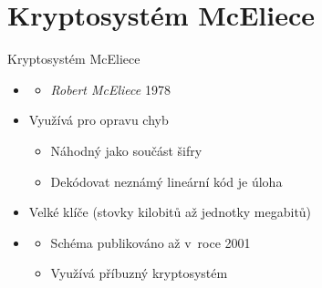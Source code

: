 \documentclass{beamer}
\begin{document}
\section{Kryptosystém McEliece}

\begin{frame}{Kryptosystém McEliece}
    \begin{itemize}

            \pause

        \item {}
            \begin{itemize}
                \item \emph{Robert McEliece} 1978~\cite{McEliece}
            \end{itemize}

            \pause
        \item Využívá  pro opravu chyb

            \begin{itemize}
                \item Náhodný  jako součást šifry
                \item Dekódovat neznámý lineární kód je 
                    úloha~\cite{Berlekamp1}
            \end{itemize}

            \pause
        \item \alert{Velké klíče} (stovky kilobitů až jednotky megabitů)

            \pause
        \item {}

            \pause
        \begin{itemize}

            \item Schéma publikováno až v~roce 2001~\cite{Courtois}
            \item Využívá příbuzný kryptosystém ~\cite{Niederreiter}

        \end{itemize}
    \end{itemize}
\end{frame}
\end{document}

